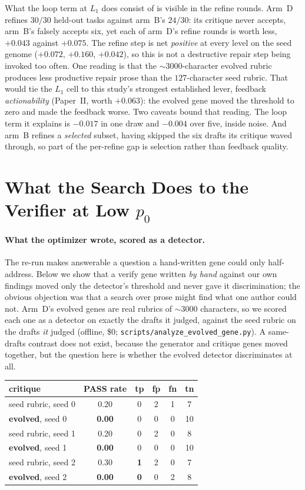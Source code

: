 \documentclass[11pt]{article}
\begin{document}
What the loop term at $L_1$ does consist of is visible in the refine rounds. Arm~D refines
$30/30$ held-out tasks against arm~B's $24/30$: its critique never accepts, arm~B's falsely
accepts six, yet each of arm~D's refine rounds is worth less, $+0.043$ against $+0.075$. The
refine step is net \emph{positive} at every level on the seed genome ($+0.072$, $+0.160$,
$+0.042$), so this is not a destructive repair step being invoked too often. One reading is that
the ${\sim}3000$-character evolved rubric produces less productive repair prose than the
$127$-character seed rubric. That would tie the $L_1$ cell to this study's strongest
established lever, feedback \emph{actionability} (Paper~II, worth $+0.063$): the
evolved gene moved the threshold to zero and made the feedback worse. Two caveats bound that
reading. The loop term it explains is $-0.017$ in one draw and $-0.004$ over five, inside noise.
And arm~B refines a \emph{selected} subset, having skipped the six drafts its critique waved
through, so part of the per-refine gap is selection rather than feedback quality.

\section{What the Search Does to the Verifier at Low \texorpdfstring{$p_0$}{p0}}
\label{sec:analysis}

\paragraph{What the optimizer wrote, scored as a detector.}
The re-run makes answerable a question a hand-written gene could only half-address. Below we
show that a verify gene written \emph{by hand} against our own findings moved only the
detector's threshold and never gave it discrimination; the obvious objection was that a
search over prose might find what one author could not. Arm~D's evolved genes are real
rubrics of ${\sim}3000$ characters, so we scored each one as a detector on exactly the drafts
it judged, against the seed rubric on the drafts \emph{it} judged (offline, \$0;
\texttt{scripts/analyze\_evolved\_gene.py}). A same-drafts contrast does not exist, because
the generator and critique genes moved together, but the question here is whether the evolved
detector discriminates at all.

\begin{center}\small
\begin{tabular}{lccccc}
\toprule
critique & PASS rate & tp & fp & fn & tn \\
\midrule
seed rubric, seed 0 & 0.20 & 0 & 2 & 1 & 7 \\
\textbf{evolved}, seed 0 & \textbf{0.00} & 0 & 0 & 0 & 10 \\
seed rubric, seed 1 & 0.20 & 0 & 2 & 0 & 8 \\
\textbf{evolved}, seed 1 & \textbf{0.00} & 0 & 0 & 0 & 10 \\
seed rubric, seed 2 & 0.30 & \textbf{1} & 2 & 0 & 7 \\
\textbf{evolved}, seed 2 & \textbf{0.00} & \textbf{0} & 0 & 2 & 8 \\
\bottomrule
\end{tabular}
\end{center}
\end{document}
